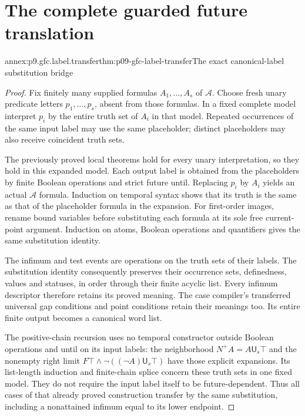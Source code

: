 
\section{The complete guarded future translation}
\label{sec:annex-p09-guarded-future-completeness}

\begin{annexitem}{annex:p9.gfc.label.transfer}{thm:p09-gfc-label-transfer}{The exact canonical-label substitution bridge}
\begin{proof}
Fix finitely many supplied formulas \(A_1,\ldots,A_s\)
of \(\mathcal A\). Choose fresh unary predicate letters
\(p_1,\ldots,p_s\), absent from those formulas. In a fixed
complete model interpret \(p_i\) by the entire truth set
of \(A_i\) in that model. Repeated occurrences of the same
input label may use the same placeholder; distinct placeholders
may also receive coincident truth sets.

The previously proved local theorems hold for every unary
interpretation, so they hold in this expanded model. Each
output label is obtained from the placeholders by finite
Boolean operations and strict future until. Replacing
\(p_i\) by \(A_i\) yields an actual \(\mathcal A\) formula.
Induction on temporal syntax shows that its truth is the
same as that of the placeholder formula in the expansion.
For first-order images, rename bound variables before
substituting each formula at its sole free current-point
argument. Induction on atoms, Boolean operations and
quantifiers gives the same substitution identity.

The infimum and test events are operations on the truth sets
of their labels. The substitution identity consequently
preserves their occurrence sets, definedness, values and
statuses, in order through their finite acyclic list.
Every infimum descriptor therefore retains its proved
meaning. The case compiler's transferred universal gap
conditions and point conditions retain their meanings too.
Its entire finite output becomes a canonical word list.

The positive-chain recursion uses no temporal constructor
outside Boolean operations and until on its input labels:
the neighborhood \(N^+A=A\mathbin{\mathsf U_s}\top\)
and the nonempty right limit
\(F\top\land\neg((\neg A)\mathbin{\mathsf U_s}\top)\)
have those explicit expansions. Its list-length induction
and finite-chain splice concern these truth sets in one
fixed model. They do not require the input label itself
to be future-dependent. Thus all cases of that already
proved construction transfer by the same substitution,
including a nonattained infimum equal to its lower endpoint.


\end{proof}
\end{annexitem}
